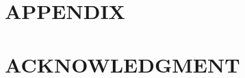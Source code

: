 \documentclass[letterpaper, 10 pt, conference]{ieeeconf}  %
\begin{document}
\section*{APPENDIX}

\section*{ACKNOWLEDGMENT}








\end{document}
